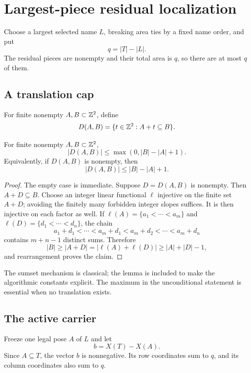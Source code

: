 \section{Largest-piece residual localization}\label{sec:localization}

Choose a largest selected name \(L\), breaking area ties by a fixed name
order, and put
\[
  q=|T|-|L|.
\]
The residual pieces are nonempty and their total area is \(q\), so there are
at most \(q\) of them.

\subsection{A translation cap}

For finite nonempty \(A,B\subset\mathbb Z^2\), define
\[
  D(A,B)=\{t\in\mathbb Z^2:A+t\subseteq B\}.
\]

\begin{lemma}\label{lem:translation}
For finite nonempty \(A,B\subset\mathbb Z^2\),
\[
 |D(A,B)|\leq \max(0,|B|-|A|+1).
\]
Equivalently, if \(D(A,B)\) is nonempty, then
\[
 |D(A,B)|\leq |B|-|A|+1.
\]
\end{lemma}

\begin{proof}
The empty case is immediate.  Suppose \(D=D(A,B)\) is nonempty.  Then
\(A+D\subseteq B\).  Choose an integer linear functional \(\ell\) injective
on the finite set \(A+D\); avoiding the finitely many forbidden integer
slopes suffices.  It is then injective on each factor as well.  If
\(\ell(A)=\{a_1<\cdots<a_m\}\) and
\(\ell(D)=\{d_1<\cdots<d_n\}\), the chain
\[
 a_1+d_1<\cdots<a_m+d_1<a_m+d_2<\cdots<a_m+d_n
\]
contains \(m+n-1\) distinct sums.  Therefore
\[
 |B|\geq|A+D|=|\ell(A)+\ell(D)|
 \geq |A|+|D|-1,
\]
and rearrangement proves the claim.
\end{proof}

The sumset mechanism is classical; the lemma is included to make the
algorithmic constants explicit.  The maximum in the unconditional statement
is essential when no translation exists.

\subsection{The active carrier}

Freeze one legal pose \(A\) of \(L\) and let
\[
  b=X(T)-X(A).
\]
Since \(A\subseteq T\), the vector \(b\) is nonnegative.  Its row coordinates
sum to \(q\), and its column coordinates also sum to \(q\).


